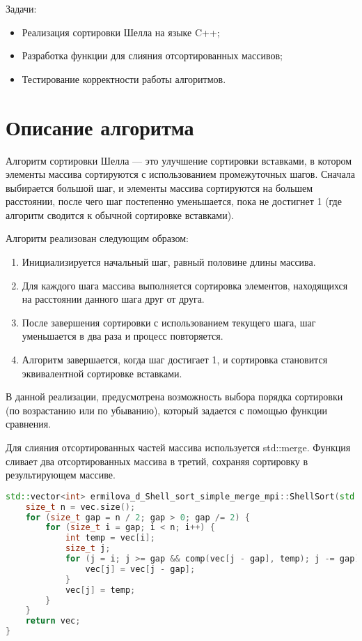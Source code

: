 \documentclass[a4paper,12pt]{article}
\begin{document}
Задачи:
\begin{itemize}
    \item Реализация сортировки Шелла на языке C++;
    \item Разработка функции для слияния отсортированных массивов;
    \item Тестирование корректности работы алгоритмов.
\end{itemize}
\newpage

\section{Описание алгоритма}
Алгоритм сортировки Шелла — это улучшение сортировки вставками, в котором элементы массива сортируются с использованием промежуточных шагов. Сначала выбирается большой шаг, и элементы массива сортируются на большем расстоянии, после чего шаг постепенно уменьшается, пока не достигнет 1 (где алгоритм сводится к обычной сортировке вставками).

Алгоритм реализован следующим образом:
\begin{enumerate}
    \item Инициализируется начальный шаг, равный половине длины массива.
    \item Для каждого шага массива выполняется сортировка элементов, находящихся на расстоянии данного шага друг от друга.
    \item После завершения сортировки с использованием текущего шага, шаг уменьшается в два раза и процесс повторяется.
    \item Алгоритм завершается, когда шаг достигает 1, и сортировка становится эквивалентной сортировке вставками.
\end{enumerate}

В данной реализации, предусмотрена возможность выбора порядка сортировки (по возрастанию или по убыванию), который задается с помощью функции сравнения.

Для слияния отсортированных частей массива используется std::merge. Функция сливает два отсортированных массива в третий, сохраняя сортировку в результирующем массиве.

\begin{lstlisting}[language=C++,caption={Функция ShellSort}]
std::vector<int> ermilova_d_Shell_sort_simple_merge_mpi::ShellSort(std::vector<int>& vec, const std::function<bool(int, int)>& comp) {
    size_t n = vec.size();
    for (size_t gap = n / 2; gap > 0; gap /= 2) {
        for (size_t i = gap; i < n; i++) {
            int temp = vec[i];
            size_t j;
            for (j = i; j >= gap && comp(vec[j - gap], temp); j -= gap) {
                vec[j] = vec[j - gap];
            }
            vec[j] = temp;
        }
    }
    return vec;
}
\end{lstlisting}
\end{document}
